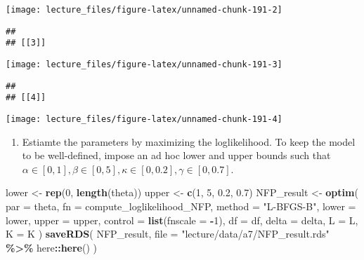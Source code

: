 \documentclass[
]{book}
\newenvironment{Shaded}{\begin{snugshade}}{\end{snugshade}}
\newcommand{\AttributeTok}[1]{\textcolor[rgb]{0.13,0.29,0.53}{#1}}
\newcommand{\DecValTok}[1]{\textcolor[rgb]{0.00,0.00,0.81}{#1}}
\newcommand{\FloatTok}[1]{\textcolor[rgb]{0.00,0.00,0.81}{#1}}
\newcommand{\FunctionTok}[1]{\textcolor[rgb]{0.13,0.29,0.53}{\textbf{#1}}}
\newcommand{\NormalTok}[1]{#1}
\newcommand{\OtherTok}[1]{\textcolor[rgb]{0.56,0.35,0.01}{#1}}
\newcommand{\SpecialCharTok}[1]{\textcolor[rgb]{0.81,0.36,0.00}{\textbf{#1}}}
\newcommand{\StringTok}[1]{\textcolor[rgb]{0.31,0.60,0.02}{#1}}
\providecommand{\tightlist}{%
  \setlength{\itemsep}{0pt}\setlength{\parskip}{0pt}}
\begin{document}
\begin{center}\texttt{[image: lecture\_files/figure-latex/unnamed-chunk-191-2]} \end{center}

\begin{verbatim}
## 
## [[3]]
\end{verbatim}

\begin{center}\texttt{[image: lecture\_files/figure-latex/unnamed-chunk-191-3]} \end{center}

\begin{verbatim}
## 
## [[4]]
\end{verbatim}

\begin{center}\texttt{[image: lecture\_files/figure-latex/unnamed-chunk-191-4]} \end{center}

\begin{enumerate}
\def\labelenumi{\arabic{enumi}.}
\setcounter{enumi}{3}
\tightlist
\item
  Estiamte the parameters by maximizing the loglikelihood. To keep the model to be well-defined, impose an ad hoc lower and upper bounds such that \(\alpha \in [0, 1], \beta \in [0, 5], \kappa \in [0, 0.2], \gamma \in [0, 0.7]\).
\end{enumerate}

\begin{Shaded}
\begin{Highlighting}[]
\NormalTok{lower }\OtherTok{\textless{}{-}} \FunctionTok{rep}\NormalTok{(}\DecValTok{0}\NormalTok{, }\FunctionTok{length}\NormalTok{(theta))}
\NormalTok{upper }\OtherTok{\textless{}{-}} \FunctionTok{c}\NormalTok{(}\DecValTok{1}\NormalTok{, }\DecValTok{5}\NormalTok{, }\FloatTok{0.2}\NormalTok{, }\FloatTok{0.7}\NormalTok{)}
\NormalTok{NFP\_result }\OtherTok{\textless{}{-}}
  \FunctionTok{optim}\NormalTok{(}
    \AttributeTok{par =}\NormalTok{ theta,}
    \AttributeTok{fn =}\NormalTok{ compute\_loglikelihood\_NFP,}
    \AttributeTok{method =} \StringTok{"L{-}BFGS{-}B"}\NormalTok{,}
    \AttributeTok{lower =}\NormalTok{ lower,}
    \AttributeTok{upper =}\NormalTok{ upper,}
    \AttributeTok{control =} \FunctionTok{list}\NormalTok{(}\AttributeTok{fnscale =} \SpecialCharTok{{-}}\DecValTok{1}\NormalTok{),}
    \AttributeTok{df =}\NormalTok{ df, }
    \AttributeTok{delta =}\NormalTok{ delta,}
    \AttributeTok{L =}\NormalTok{ L,}
    \AttributeTok{K =}\NormalTok{ K}
\NormalTok{  )}
\FunctionTok{saveRDS}\NormalTok{(}
\NormalTok{  NFP\_result, }
  \AttributeTok{file =} \StringTok{"lecture/data/a7/NFP\_result.rds"} \SpecialCharTok{\%\textgreater{}\%}\NormalTok{ here}\SpecialCharTok{::}\FunctionTok{here}\NormalTok{()}
\NormalTok{)}
\end{Highlighting}
\end{Shaded}
\end{document}
